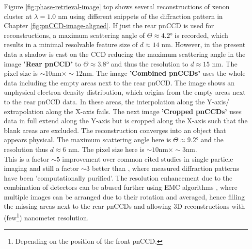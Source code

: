 Figure \ref{fig:phase-retrieval-image} top shows several reconstructions of xenon cluster at $\lambda = 1.0$ nm using different snippets of the diffraction pattern in Chapter \ref{fig:pnCCD-image-aligned}. If just the rear pnCCD is used for reconstructions, a maximum scattering angle of $\Theta\approx 4.2$° is recorded, which results in a minimal resolvable feature size of $d\approx 14$ nm. However, in the present data a shadow is cast on the CCD reducing the maximum scattering angle in the image \textbf{'Rear pnCCD'} to $\Theta\approx 3.8$° and thus the resolution to $d\approx 15$ nm. The pixel size is $\sim 10 \text{nm} \times \sim 12 \text{nm}$. The image \textbf{'Combined pnCCDs'} uses the whole data including the empty areas next to the rear pnCCD. The image shows an unphysical electron density distribution, which origins from the empty areas next to the rear pnCCD data. In these areas, the interpolation along the Y-axis/ extrapolation along the X-axis fails. The next image \textbf{'Cropped pnCCDs'} uses data in full extend along the Y-axis but is cropped along the X-axis such that the blank areas are excluded. The reconstruction converges into an object that appears physical. The maximum scattering angle here is $\Theta \approx 9.2$° and the resolution thus $d\approx 6$ nm. The pixel size here is $\sim 10 \text{nm} \times \sim 3 \text{nm}$.\\
This is a factor $\sim 5$ improvement over common cited studies in single particle imaging \citep{Seibert-2011-Nature} and still a factor $\sim 3$ better than \citep{Hantke-2014-NatPho}, where measured diffraction patterns have been 'computationally purified'. The resolution enhancement due to the combination of detectors can be abused further using EMC algorithms \citep{Loh-2009-PRE}, where multiple images can be arranged due to their rotation and averaged, hence filling the missing areas next to the rear pnCCDs and allowing 3D reconstructions with (few\footnote{Depending on the position of the front pnCCD.}) nanometer resolution.\\
%
%
%

